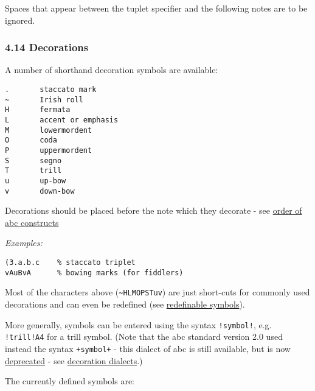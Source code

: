 Spaces that appear between the tuplet specifier and the following notes
are to be ignored.

\hypertarget{decorations}{\subsubsection{4.14
Decorations}\label{decorations}}

A number of shorthand decoration symbols are available:

\begin{verbatim}
.       staccato mark
~       Irish roll
H       fermata
L       accent or emphasis
M       lowermordent
O       coda
P       uppermordent
S       segno
T       trill
u       up-bow
v       down-bow
\end{verbatim}

Decorations should be placed before the note which they decorate - see
\protect\hyperlink{order_of_abc_constructs}{order of abc constructs}

\emph{Examples:}

\begin{verbatim}
(3.a.b.c    % staccato triplet
vAuBvA      % bowing marks (for fiddlers)
\end{verbatim}

Most of the characters above (\texttt{\textasciitilde{}HLMOPSTuv}) are
just short-cuts for commonly used decorations and can even be redefined
(see \protect\hyperlink{redefinable_symbols}{redefinable symbols}).

More generally, symbols can be entered using the syntax
\texttt{!symbol!}, e.g. \texttt{!trill!A4} for a trill symbol. (Note
that the abc standard version 2.0 used instead the syntax
\texttt{+symbol+} - this dialect of abc is still available, but is now
\protect\hyperlink{outdated_syntax}{deprecated} - see
\protect\hyperlink{decoration_dialects}{decoration dialects}.)

The currently defined symbols are:

